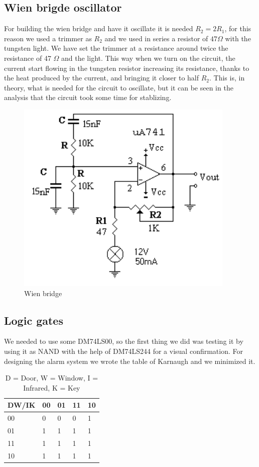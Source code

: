 \subsection{Wien brigde oscillator}
For building the wien bridge and have it oscillate it is needed $R_2 = 2 R_1$, for this reason we used a trimmer as $R_2$ and we used in series a resistor of $47 \Omega$ with the tungsten light. We have  set the trimmer at a resistance around twice the resistance of 47 $\Omega$ and the light. This way when we turn on the circuit, the current start flowing in the tungsten resistor increasing its resistance, thanks to the heat produced by the current, and bringing it closer to half $R_2$. This is, in theory, what is needed for the circuit to oscillate, but it can be seen in the analysis that the circuit took some time for stablizing.
\begin{figure}[H]
\centering
\includegraphics[width=.7\textwidth]{9/wien.png}
\caption{Wien bridge}\label{wwien}
\end{figure}
\subsection{Logic gates}
We needed to use some DM74LS00, so the first thing we did was testing it by using it as NAND with the help of DM74LS244 for a visual confirmation.
For designing the alarm system we wrote the table of Karnaugh and we minimized it.

\begin{table}[]
\centering
\label{my-label}
\begin{tabular}{lllll}
\hline
 DW/IK & 00 & 01 & 11 & 10 \\ \hline
 00    & 0  & 0  & 0  & 1 \\
 01    & 1  & 1  & 1  & 1 \\
 11    & 1  & 1  & 1  & 1 \\ 
 10    & 1  & 1  & 1  & 1 \\ \hline
\end{tabular}\caption{D = Door, W = Window, I = Infrared, K = Key}

\end{table}

